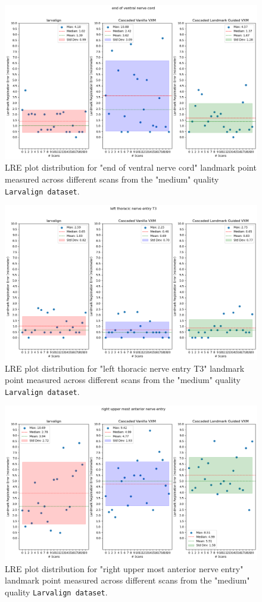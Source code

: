 \documentclass{book}
\begin{document}
	\begin{figure}[h!]
		\centering
		\includegraphics[width=0.75\columnwidth]{resources/chapter5_fresh/output/end of ventral nerve cord.png}
		\caption{LRE plot distribution for "end of ventral nerve cord" landmark point measured across different scans from the "medium" quality \texttt{Larvalign dataset}.}
		\label{fig:landmark15}
	\end{figure}
	
	\begin{figure}[h!]
		\centering
		\includegraphics[width=0.75\columnwidth]{resources/chapter5_fresh/output/left thoracic nerve entry T3.png}
		\caption{LRE plot distribution for "left thoracic nerve entry T3" landmark point measured across different scans from the "medium" quality \texttt{Larvalign dataset}.}
		\label{fig:landmark16}
	\end{figure}
	
	\begin{figure}[h!]
		\centering
		\includegraphics[width=0.75\columnwidth]{resources/chapter5_fresh/output/right upper most anterior nerve entry.png}
		\caption{LRE plot distribution for "right upper most anterior nerve entry" landmark point measured across different scans from the "medium" quality \texttt{Larvalign dataset}.}
		\label{fig:landmark17}
	\end{figure}
	
\end{document}

